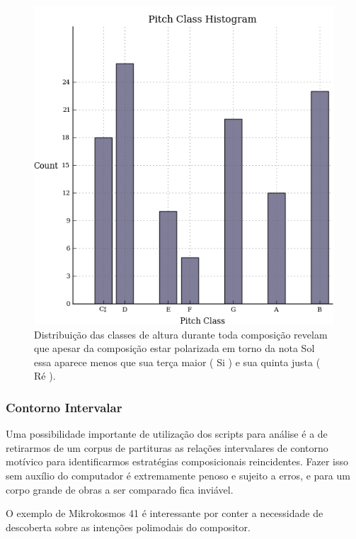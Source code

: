 \documentclass[
	12pt,				%
	openright,			%
	twoside,			%
	a4paper,			%
	english,			%
	french,				%
	spanish,			%
	brazil				%
	]{abntex2}
\begin{document}
\begin{figure}[!h]
	\caption{\label{fig_grafico} Distribuição das classes de altura durante toda composição revelam que apesar da composição estar polarizada em torno da nota Sol essa aparece menos que sua terça maior ( Si ) e sua quinta justa ( Ré ). } 
	\begin{center}
	    \includegraphics[scale=0.4]{estudosM21/mikro041Pclass.png}
	\end{center}
\end{figure}



\subsubsection{Contorno Intervalar}
\label{mikrocontorno}

Uma possibilidade importante de utilização dos scripts para análise é a de retirarmos de um corpus de partituras as relações intervalares de contorno motívico para identificarmos estratégias composicionais reincidentes. Fazer isso sem auxílio do computador é extremamente penoso e sujeito a erros, e para um corpo grande de obras a ser comparado fica inviável.

O exemplo de Mikrokosmos 41 é interessante por conter a necessidade de descoberta sobre as intenções polimodais do compositor.
\end{document}

